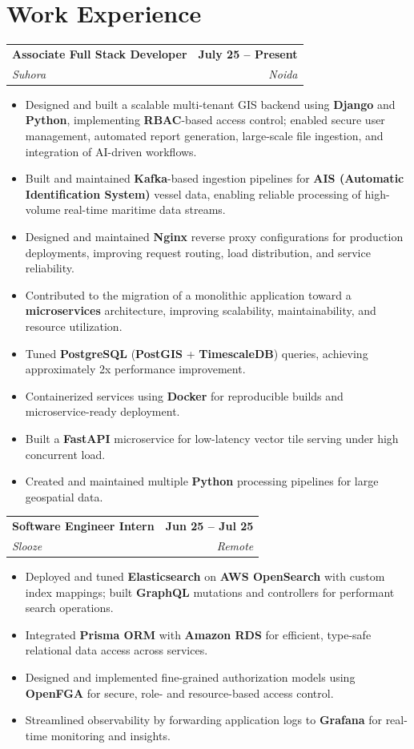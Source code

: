 \documentclass[10pt,letterpaper]{article}
\makeatletter
\newcommand{\resumeEntry}[4]{%
  \begin{tabularx}{\textwidth}{@{}Xr@{}}
    \textbf{#1} & \textbf{#4} \\
    \textit{#2} & \textit{#3}
  \end{tabularx}
}
\makeatother
\begin{document}
\section{Work Experience}
\resumeEntry{Associate Full Stack Developer}{Suhora}{Noida}{July 25 -- Present}
\begin{itemize}
  \item Designed and built a scalable multi-tenant GIS backend using \textbf{Django} and \textbf{Python}, implementing \textbf{RBAC}-based access control; enabled secure user management, automated report generation, large-scale file ingestion, and integration of AI-driven workflows.
  \item Built and maintained \textbf{Kafka}-based ingestion pipelines for \textbf{AIS (Automatic Identification System)} vessel data, enabling reliable processing of high-volume real-time maritime data streams.
  \item Designed and maintained \textbf{Nginx} reverse proxy configurations for production deployments, improving request routing, load distribution, and service reliability.
  \item Contributed to the migration of a monolithic application toward a \textbf{microservices} architecture, improving scalability, maintainability, and resource utilization.
  \item Tuned \textbf{PostgreSQL} (\textbf{PostGIS} + \textbf{TimescaleDB}) queries, achieving approximately 2x performance improvement.
  \item Containerized services using \textbf{Docker} for reproducible builds and microservice-ready deployment.
  \item Built a \textbf{FastAPI} microservice for low-latency vector tile serving under high concurrent load.
  \item Created and maintained multiple \textbf{Python} processing pipelines for large geospatial data.
\end{itemize}

\resumeEntry{Software Engineer Intern}{Slooze}{Remote}{Jun 25 -- Jul 25}
\begin{itemize}
  \item Deployed and tuned \textbf{Elasticsearch} on \textbf{AWS OpenSearch} with custom index mappings; built \textbf{GraphQL} mutations and controllers for performant search operations.
  \item Integrated \textbf{Prisma ORM} with \textbf{Amazon RDS} for efficient, type-safe relational data access across services.
  \item Designed and implemented fine-grained authorization models using \textbf{OpenFGA} for secure, role- and resource-based access control.
  \item Streamlined observability by forwarding application logs to \textbf{Grafana} for real-time monitoring and insights.
\end{itemize}
\end{document}
